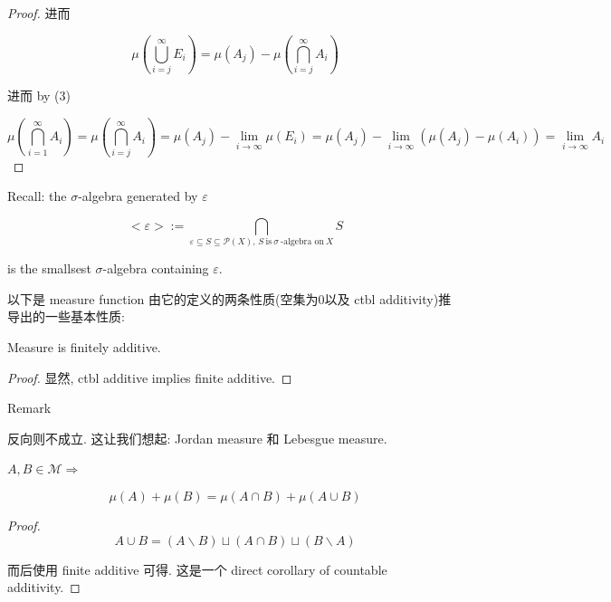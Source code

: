\begin{theorem}{}
\begin{enumerate}
\begin{proof}
  进而

  \[\mu(\bigcup\limits_{i = j}^{\infty}E_{i}) = \mu(A_{j}) - \mu(\bigcap\limits_{i = j}^{\infty}A_{i})\]

  进而 by (3)

  \[\mu(\bigcap\limits_{i = 1}^{\infty}A_{i}) = \mu(\bigcap\limits_{i = j}^{\infty}A_{i}) = \mu(A_{j}) - \lim\limits_{i\rightarrow\infty}\mu(E_{i}) = \mu(A_{j}) - \lim\limits_{i\rightarrow\infty}(\mu(A_{j}) - \mu(A_{i})) = \lim\limits_{i\rightarrow\infty}A_{i}\]

  \end{proof}
\end{enumerate}

\end{theorem}

Recall: the \(\sigma\)-algebra generated by \(\varepsilon\)

\[< \varepsilon > := \bigcap\limits_{\varepsilon \subseteq S \subseteq \mathcal{P}(X),\, S\ \text{is}\ \sigma\ \text{-algebra on}\ X}S\]

is the smallsest \(\sigma\)-algebra containing \(\varepsilon\).

以下是 measure function 由它的定义的两条性质(空集为0以及 ctbl additivity)推导出的一些基本性质:

\begin{lemma}{}

Measure is finitely additive.

\end{lemma}

\begin{proof}

显然, ctbl additive implies finite additive.

\end{proof}

\begin{qlremark}{Remark}

反向则不成立. 这让我们想起: Jordan measure 和 Lebesgue measure.

\end{qlremark}

\begin{lemma}

\(A,B \in \mathcal{M}\Longrightarrow\)

\[\mu(A) + \mu(B) = \mu(A \cap B) + \mu(A \cup B)\]

\end{lemma}

\begin{proof}

\[A \cup B = (A\backslash B) \sqcup (A \cap B) \sqcup (B\backslash A)\]

而后使用 finite additive 可得. 这是一个 direct corollary of countable additivity.

\end{proof}

